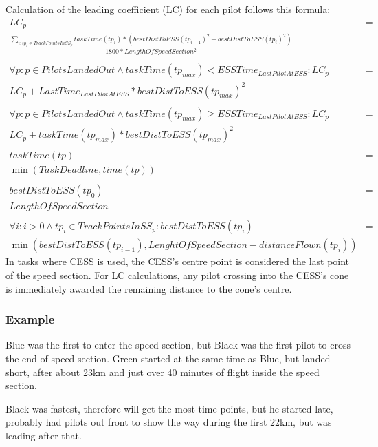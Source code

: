 \documentclass{article}
\begin{document}
Calculation of the leading coefficient (LC) for each pilot follows this formula:
\begin{align*}
    LC_p &= \\
    \frac{\sum_{i : tp_i \in TrackPointsInSS_p} taskTime(tp_i) * (bestDistToESS(tp_{i - 1})^2 - bestDistToESS(tp_i)^2)}{1800 * LengthOfSpeedSection^2} \\
    \\
    \forall p : p \in PilotsLandedOut \land taskTime(tp_{max}) < ESSTime_{LastPilotAtESS} : LC_p &= \\
    LC_p + LastTime_{LastPilotAtESS} * bestDistToESS(tp_{max})^2 \\
    \\
    \forall p : p \in PilotsLandedOut \land taskTime(tp_{max}) \geq ESSTime_{LastPilotAtESS} : LC_p &= \\
    LC_p + taskTime(tp_{max}) * bestDistToESS(tp_{max})^2 \\
    \\
    taskTime(tp) &= \\
    \min(TaskDeadline, time(tp)) \\
    \\
    bestDistToESS(tp_0) &= \\
    LengthOfSpeedSection \\
    \\
    \forall i : i > 0 \land tp_i \in TrackPointsInSS_p : bestDistToESS(tp_i) &= \\
    \min(bestDistToESS(tp_{i - 1}), LenghtOfSpeedSection - distanceFlown(tp_i))
\end{align*}
In tasks where CESS is used, the CESS’s centre point is considered the last point of the speed section. For
LC calculations, any pilot crossing into the CESS’s cone is immediately awarded the remaining distance
to the cone’s centre.

\subsubsection{Example}
Blue was the first to enter the speed section, but Black was the first pilot to cross the end of speed
section. Green started at the same time as Blue, but landed short, after about 23km and just over 40
minutes of flight inside the speed section.

Black was fastest, therefore will get the most time points, but he started late, probably had pilots out
front to show the way during the first 22km, but was leading after that.
\end{document}
